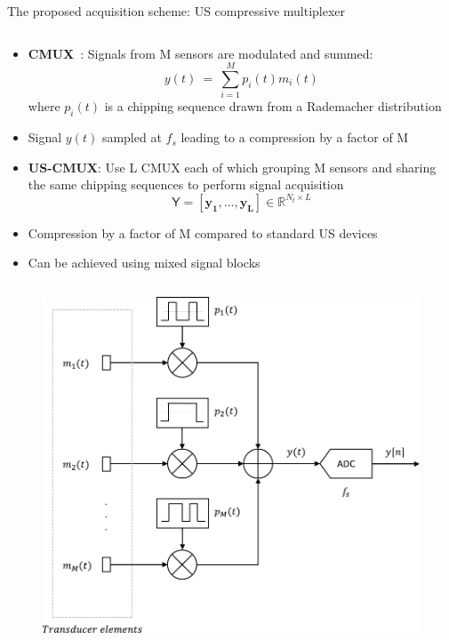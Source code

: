 {\begin{block}{The proposed acquisition scheme: US compressive multiplexer}
	\begin{column}{.54\textwidth} %
		\begin{itemize}
			\item \textbf{CMUX}~\cite{kim2012}: Signals from M sensors are modulated and summed:
			\begin{equation*}
			y \left(t\right)~=~ \sum_{i=1}^{M} p_i \left(t\right) m_i \left(t\right)
			\end{equation*}
			where $p_i\left(t\right)$ is a chipping sequence drawn from a Rademacher distribution
			\item Signal $y \left(t\right)$ sampled at $f_s$ leading to a compression by a factor of M
			\item \textbf{US-CMUX}: Use L CMUX each of which grouping M sensors and sharing the same chipping sequences to perform signal acquisition
			\begin{equation*}
				\mathsf{Y} = \left[\bm{y_1}, ..., \bm{y_L}\right] \in \mathbb{R}^{N_t \times L}
			\end{equation*}
			\item Compression by a factor of M compared to standard US devices
			\item Can be achieved using mixed signal blocks~\cite{kim2012}
		\end{itemize}
	\end{column}
	\begin{column}{.43\textwidth}
		\begin{figure}[htb]
			\includegraphics[width=0.8\linewidth]{figures/CMUX.pdf}

\end{figure}
\end{column}
\end{block}}
